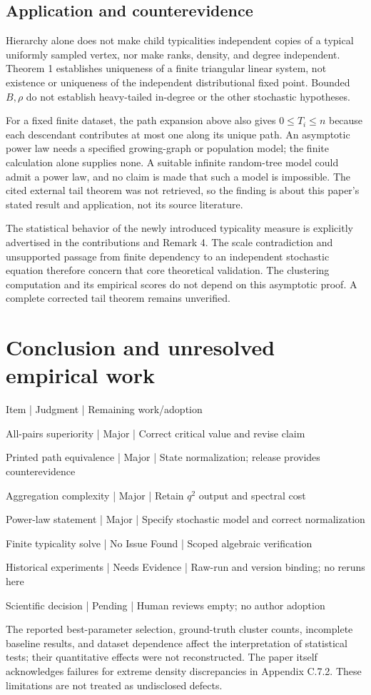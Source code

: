 \documentclass[10pt]{article}
\begin{document}
\subsection*{Application and counterevidence}
Hierarchy alone does not make child typicalities independent copies of a typical uniformly sampled vertex, nor make ranks, density, and degree independent. Theorem 1 establishes uniqueness of a finite triangular linear system, not existence or uniqueness of the independent distributional fixed point. Bounded \(B,\rho\) do not establish heavy-tailed in-degree or the other stochastic hypotheses.\par
For a fixed finite dataset, the path expansion above also gives \(0\le T_i\le n\) because each descendant contributes at most one along its unique path. An asymptotic power law needs a specified growing-graph or population model; the finite calculation alone supplies none. A suitable infinite random-tree model could admit a power law, and no claim is made that such a model is impossible. The cited external tail theorem was not retrieved, so the finding is about this paper’s stated result and application, not its source literature.\par
The statistical behavior of the newly introduced typicality measure is explicitly advertised in the contributions and Remark 4. The scale contradiction and unsupported passage from finite dependency to an independent stochastic equation therefore concern that core theoretical validation. The clustering computation and its empirical scores do not depend on this asymptotic proof. A complete corrected tail theorem remains unverified.\par
\section*{Conclusion and unresolved empirical work}
Item | Judgment | Remaining work/adoption\par
All-pairs superiority | Major | Correct critical value and revise claim\par
Printed path equivalence | Major | State normalization; release provides counterevidence\par
Aggregation complexity | Major | Retain \(q^2\) output and spectral cost\par
Power-law statement | Major | Specify stochastic model and correct normalization\par
Finite typicality solve | No Issue Found | Scoped algebraic verification\par
Historical experiments | Needs Evidence | Raw-run and version binding; no reruns here\par
Scientific decision | Pending | Human reviews empty; no author adoption\par
The reported best-parameter selection, ground-truth cluster counts, incomplete baseline results, and dataset dependence affect the interpretation of statistical tests; their quantitative effects were not reconstructed. The paper itself acknowledges failures for extreme density discrepancies in Appendix C.7.2. These limitations are not treated as undisclosed defects.\par
\end{document}

